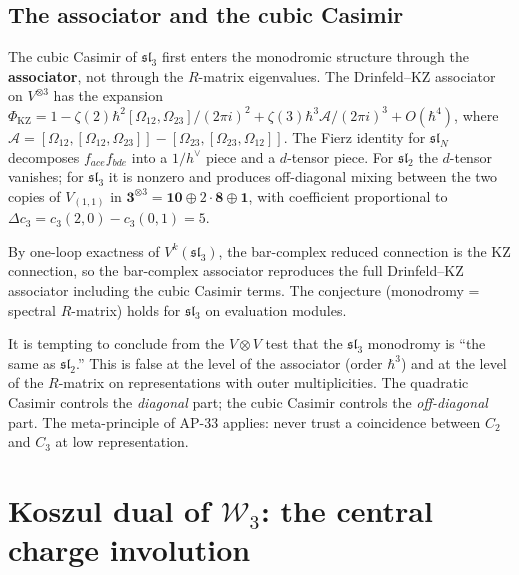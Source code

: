 \documentclass[11pt]{article}
\newcommand{\cW}{\mathcal{W}}
\newcommand{\fsl}{\mathfrak{sl}}
\begin{document}
\subsection{The associator and the cubic Casimir}
\label{subsec:sl3-associator}

The cubic Casimir of $\fsl_3$ first enters the monodromic
structure through the \textbf{associator}, not through the
$R$-matrix eigenvalues.  The Drinfeld--KZ associator on
$V^{\otimes 3}$ has the expansion
$\Phi_{\mathrm{KZ}} = 1 - \zeta(2)\hbar^2 [\Omega_{12},\Omega_{23}]/(2\pi i)^2
+ \zeta(3)\hbar^3 \mathcal{A}/(2\pi i)^3 + O(\hbar^4)$,
where $\mathcal{A} = [\Omega_{12},[\Omega_{12},\Omega_{23}]]
- [\Omega_{23},[\Omega_{23},\Omega_{12}]]$.  The Fierz identity
for $\fsl_N$ decomposes $f_{ace}f_{bde}$ into a $1/h^\vee$ piece
and a $d$-tensor piece.  For $\fsl_2$ the $d$-tensor vanishes;
for $\fsl_3$ it is nonzero and produces off-diagonal mixing between
the two copies of $V_{(1,1)}$ in $\mathbf{3}^{\otimes 3}
= \mathbf{10} \oplus 2\cdot\mathbf{8} \oplus \mathbf{1}$,
with coefficient proportional to
$\Delta c_3 = c_3(2,0) - c_3(0,1) = 5$.

By one-loop exactness of $V^k(\fsl_3)$, the bar-complex
reduced connection is the KZ connection, so the bar-complex
associator reproduces the full Drinfeld--KZ associator including
the cubic Casimir terms.  The conjecture (monodromy = spectral
$R$-matrix) holds for $\fsl_3$ on evaluation modules.

\begin{warning}
It is tempting to conclude from the $V \otimes V$ test that the
$\fsl_3$ monodromy is ``the same as $\fsl_2$.''  This is false
at the level of the associator (order $\hbar^3$) and at the
level of the $R$-matrix on representations with outer
multiplicities.  The quadratic Casimir controls the \emph{diagonal}
part; the cubic Casimir controls the \emph{off-diagonal} part.
The meta-principle of AP-33 applies: never trust a coincidence
between $C_2$ and $C_3$ at low representation.
\end{warning}



\section{Koszul dual of $\cW_3$: the central charge involution}
\label{sec:koszul-dual-W3}
\end{document}
